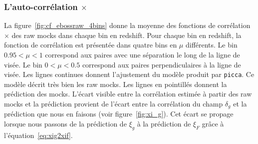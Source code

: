 \subsubsection{L'auto-corrélation \lya{}$\times$\lya{}}
La figure~\ref{fig:cf_ebossraw_4bins} donne la moyenne des \Nmocks{} fonctions de corrélation \lya{}$\times$\lya{} des raw mocks dans chaque bin en redshift.
Pour chaque bin en redshift, la fonction de corrélation est présentée dans quatre bins en $\mu$ différents. Le bin $\num{0.95} < \mu < 1$ correspond aux paires avec une séparation le long de la ligne de visée. Le bin $\num{0} < \mu < \num{0.5}$ correspond aux paires perpendiculaires à la ligne de visée.
Les lignes continues donnent l'ajustement du modèle produit par \texttt{picca}.
Ce modèle décrit très bien les raw mocks.
Les lignes en pointillés donnent la prédiction des mocks. L'écart visible entre la corrélation estimée à partir des raw mocks et la prédiction provient de l'écart entre la corrélation du champ $\delta_g$ et la prédiction que nous en faisons (voir figure~\ref{fig:xi_g}). Cet écart se propage lorsque nous passons de la prédiction de $\xi_g$ à la prédiction de $\xi_F$ grâce à l'équation~\ref{eq:xig2xif}.
